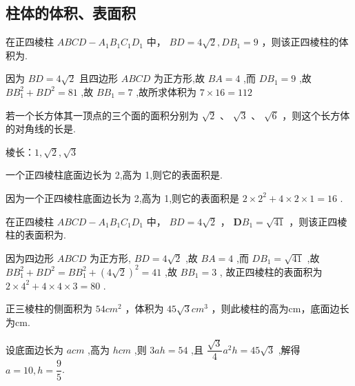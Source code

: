 \subsection*{柱体的体积、表面积}
\begin{enumerate}
    \item 在正四棱柱 ${ABCD} - {A}_{1}{B}_{1}{C}_{1}{D}_{1}$ 中， ${BD} = {4\sqrt{2}},{D{B}_{1}} = 9$ ，则该正四棱柱的体积为.
    \begin{jieda}
        因为 ${BD} = 4\sqrt{2}$ 且四边形 ${ABCD}$ 为正方形,故 ${BA} = 4$ ,而 $D{B}_{1} = 9$ ,故 $B{B}_{1}^{2} + B{D}^{2} = {81}$ ,故 $B{B}_{1} = 7$ ,故所求体积为 $7 \times  {16} = {112}$
    \end{jieda}

    \item 若一个长方体其一顶点的三个面的面积分别为 $\sqrt{2}$ 、 $\sqrt{3}$ 、 $\sqrt{6}$ ，则这个长方体的对角线的长是.
    \begin{jieda}
        棱长：$1, \sqrt{2}, \sqrt{3}$
    \end{jieda}
    
    \item 一个正四棱柱底面边长为 2,高为 1,则它的表面积是.
    \begin{jieda}
        因为一个正四棱柱底面边长为 2,高为 1,则它的表面积是 $2 \times  {2}^{2} + 4 \times  2 \times  1 = {16}$ .
    
    \item 在正四棱柱 ${ABCD} - {A}_{1}{B}_{1}{C}_{1}{D}_{1}$ 中， ${BD} = {4\sqrt{2}}$ ， $\mathbf{D}{B}_{1} = \sqrt{41}$ ，则该正四棱柱的表面积为.
    \begin{jieda}
        因为四边形 ${ABCD}$ 为正方形, ${BD} = 4\sqrt{2}$ ,故 ${BA} = 4$ ,而 $D{B}_{1} = \sqrt{41}$ ,故 $B{B}_{1}^{2} + B{D}^{2} = B{B}_{1}^{2} + {\left( 4\sqrt{2}\right) }^{2} = {41}$ ,故 $B{B}_{1} = 3$ , 故正四棱柱的表面积为 $2 \times  {4}^{2} + 4 \times  4 \times  3 = {80}$ .
    \end{jieda}
    \end{jieda}
    
    \item 正三棱柱的侧面积为 ${54}{{{cm}}}^{2}$ ，体积为 ${45}\sqrt{3}{{{cm}}}^{3}$ ，则此棱柱的高为cm，底面边长为cm. 
    \begin{jieda}
        设底面边长为 $a{{cm}}$ ,高为 $h{{cm}}$ ,则 ${3ah} = {54}$ ,且 $\dfrac{\sqrt{3}}{4}{a}^{2}h = {45}\sqrt{3}$ ,解得 $a = {10},h = \dfrac{9}{5}$.
    \end{jieda}
    

\end{enumerate}
